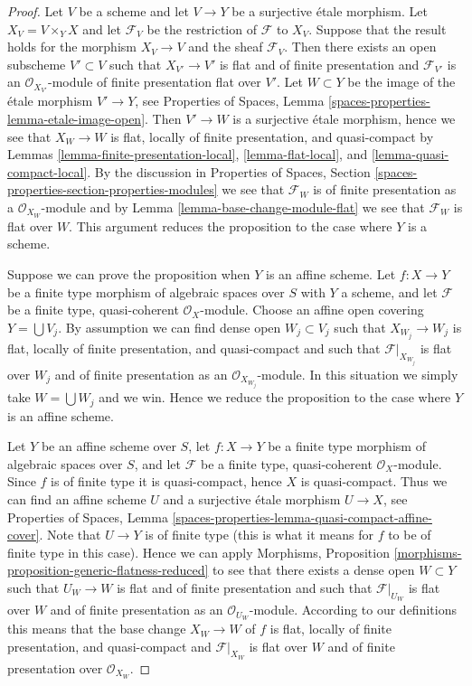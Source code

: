 \documentclass[10pt,a4paper]{amsart}
\theoremstyle{plain}
\theoremstyle{definition}
\theoremstyle{remark}
\numberwithin{equation}{subsection}
\begin{document}
\begin{proof}
Let $V$ be a scheme and let $V \to Y$ be a surjective \'etale morphism.
Let $X_V = V \times_Y X$ and let $\mathcal{F}_V$ be the restriction of
$\mathcal{F}$ to $X_V$. Suppose that the result holds for the morphism
$X_V \to V$ and the sheaf $\mathcal{F}_V$. Then there exists an open subscheme
$V' \subset V$ such that $X_{V'} \to V'$ is flat and of finite presentation
and $\mathcal{F}_{V'}$ is an $\mathcal{O}_{X_{V'}}$-module of finite
presentation flat over $V'$. Let $W \subset Y$ be the image of
the \'etale morphism $V' \to Y$, see
Properties of Spaces, Lemma \ref{spaces-properties-lemma-etale-image-open}.
Then $V' \to W$ is a surjective \'etale morphism, hence we see that
$X_W \to W$ is flat, locally of finite presentation, and quasi-compact by
Lemmas \ref{lemma-finite-presentation-local},
\ref{lemma-flat-local}, and
\ref{lemma-quasi-compact-local}.
By the discussion in
Properties of Spaces, Section
\ref{spaces-properties-section-properties-modules}
we see that $\mathcal{F}_W$ is of finite presentation as a
$\mathcal{O}_{X_W}$-module and by
Lemma \ref{lemma-base-change-module-flat}
we see that $\mathcal{F}_W$ is flat over $W$. This argument
reduces the proposition to the case where $Y$ is a scheme.

\medskip\noindent
Suppose we can prove the proposition when $Y$ is an affine scheme.
Let $f : X \to Y$ be a finite type morphism of algebraic spaces
over $S$ with $Y$ a scheme, and let $\mathcal{F}$ be a finite type,
quasi-coherent $\mathcal{O}_X$-module. Choose an affine open covering
$Y = \bigcup V_j$. By assumption we can find dense open $W_j \subset V_j$
such that $X_{W_j} \to W_j$ is flat, locally of finite presentation, and
quasi-compact and such that $\mathcal{F}|_{X_{W_j}}$ is flat over $W_j$
and of finite presentation as an $\mathcal{O}_{X_{W_j}}$-module. In this
situation we simply take $W = \bigcup W_j$ and we win. Hence we reduce
the proposition to the case where $Y$ is an affine scheme.

\medskip\noindent
Let $Y$ be an affine scheme over $S$, let
$f : X \to Y$ be a finite type morphism of algebraic spaces
over $S$, and let $\mathcal{F}$ be a finite type,
quasi-coherent $\mathcal{O}_X$-module. Since $f$ is of finite type
it is quasi-compact, hence $X$ is quasi-compact. Thus we can find
an affine scheme $U$ and a surjective \'etale morphism $U \to X$, see
Properties of Spaces, Lemma
\ref{spaces-properties-lemma-quasi-compact-affine-cover}.
Note that $U \to Y$ is of finite type (this is what it means for
$f$ to be of finite type in this case). Hence we can apply
Morphisms, Proposition \ref{morphisms-proposition-generic-flatness-reduced}
to see that there exists a dense open $W \subset Y$ such that
$U_W \to W$ is flat and of finite presentation and such that
$\mathcal{F}|_{U_W}$ is flat over $W$ and of finite presentation
as an $\mathcal{O}_{U_W}$-module. According to our definitions this means that
the base change $X_W \to W$ of $f$ is flat, locally of finite presentation,
and quasi-compact and $\mathcal{F}|_{X_W}$ is flat over $W$ and of
finite presentation over $\mathcal{O}_{X_W}$.
\end{proof}
\end{document}
